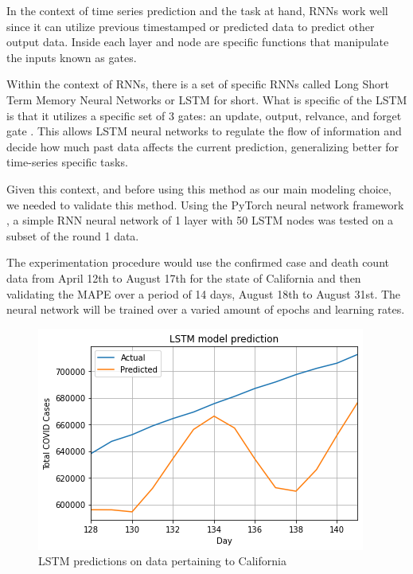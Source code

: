\documentclass[sigconf,nonacm]{acmart}
\begin{document}
In the context of time series prediction and the task at hand, RNNs work well
since it can utilize previous timestamped or predicted data to predict other
output data. Inside each layer and node are specific functions that manipulate
the inputs known as gates.

Within the context of RNNs, there is a set of specific RNNs called Long Short
Term Memory Neural Networks or LSTM for short. What is specific of the LSTM is
that it utilizes a specific set of 3 gates: an update, output, relvance, and
forget gate \cite{LSTMlecture}. This allows LSTM neural networks to regulate
the flow of information and decide how much past data affects the current
prediction, generalizing better for time-series specific tasks.

Given this context, and before using this method as our main modeling choice,
we needed to validate this method. Using the PyTorch neural network framework
\cite{Pytorch}, a simple RNN neural network of 1 layer with 50 LSTM nodes was
tested on a subset of the round 1 data. 

The experimentation procedure would use the confirmed case and death count data
from April 12th to August 17th for the state of California and then validating
the MAPE over a period of 14 days, August 18th to August 31st. The neural
network will be trained over a varied amount of epochs and learning rates. 

\begin{figure}
  \centering
  \includegraphics[width=\linewidth]{figures/LSTMPytorch.png}
  \caption{LSTM predictions on data pertaining to California}
  \label{fig:LSTM_trial}
\end{figure}
\end{document}
